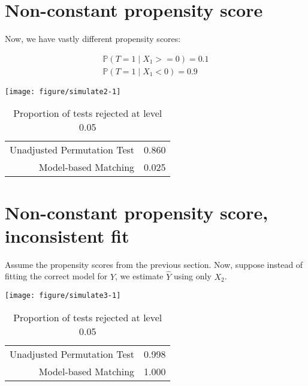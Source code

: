 \documentclass[11pt]{article}\usepackage[]{graphicx}\usepackage[]{color}
\makeatletter
\def\maxwidth{ %
  \ifdim\Gin@nat@width>\linewidth
    \linewidth
  \else
    \Gin@nat@width
  \fi
}
\newenvironment{knitrout}{}{} %
\makeatother
\begin{document}
\section{Non-constant propensity score}

Now, we have vastly different propensity scores:

\begin{align*}
\mathbb{P}(T = 1 \mid X_1 >= 0) = 0.1 \\
\mathbb{P}(T = 1 \mid X_1 < 0)  = 0.9
\end{align*}


\begin{knitrout}
\color{fgcolor}

{\centering \texttt{[image: figure/simulate2-1]} 

}



\end{knitrout}

\begin{table}[ht]
\centering
\begin{tabular}{rr}
  \hline
  \hline
Unadjusted Permutation Test & 0.860 \\ 
  Model-based Matching & 0.025 \\ 
   \hline
\end{tabular}
\caption{Proportion of tests rejected at level 0.05} 
\end{table}



\section{Non-constant propensity score, inconsistent fit}

Assume the propensity scores from the previous section.  Now, suppose instead of fitting the correct model for $Y$, we estimate $\hat{Y}$ using only $X_2$.


\begin{knitrout}
\color{fgcolor}

{\centering \texttt{[image: figure/simulate3-1]} 

}



\end{knitrout}


\begin{table}[ht]
\centering
\begin{tabular}{rr}
  \hline
  \hline
Unadjusted Permutation Test & 0.998 \\ 
  Model-based Matching & 1.000 \\ 
   \hline
\end{tabular}
\caption{Proportion of tests rejected at level 0.05} 
\end{table}
\end{document}
